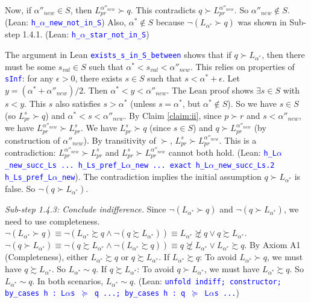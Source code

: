 \documentclass{article}
\theoremstyle{definition}
\newcommand{\tactic}[1]{\textcolor{blue}{\texttt{#1}}}
\newcommand{\pref}{\succsim} %
\newcommand{\strictpref}{\succ} %
\newcommand{\indiff}{\sim} %
\begin{document}
    Now, if $\alpha''_{new} \in S$, then $L_{pr}^{\alpha''_{new}} \strictpref q$. This contradicts $q \strictpref L_{pr}^{\alpha''_{new}}$.
    So $\alpha''_{new} \notin S$. (Lean: \tactic{h\_$\alpha$\_new\_not\_in\_S})
    Also, $\alpha^* \notin S$ because $\lnot (L_{\alpha^*} \strictpref q)$ was shown in Sub-step 1.4.1. (Lean: \tactic{h\_$\alpha$\_star\_not\_in\_S})

    The argument in Lean \tactic{exists\_s\_in\_S\_between} shows that if $q \succ L_{\alpha^*}$, then there must be some $s_{val} \in S$ such that $\alpha^* < s_{val} < \alpha''_{new}$.
    This relies on properties of \tactic{sInf}: for any $\epsilon > 0$, there exists $s \in S$ such that $s < \alpha^* + \epsilon$.
    Let $y = (\alpha^* + \alpha''_{new})/2$. Then $\alpha^* < y < \alpha''_{new}$.
    The Lean proof shows $\exists s \in S$ with $s < y$. This $s$ also satisfies $s > \alpha^*$ (unless $s=\alpha^*$, but $\alpha^* \notin S$).
    So we have $s \in S$ (so $L_{pr}^s \strictpref q$) and $\alpha^* < s < \alpha''_{new}$.
    By Claim \ref{claim:ii}, since $p \strictpref r$ and $s < \alpha''_{new}$, we have $L_{pr}^{\alpha''_{new}} \strictpref L_{pr}^s$.
    We have $L_{pr}^s \strictpref q$ (since $s \in S$) and $q \strictpref L_{pr}^{\alpha''_{new}}$ (by construction of $\alpha''_{new}$).
    By transitivity of $\strictpref$, $L_{pr}^s \strictpref L_{pr}^{\alpha''_{new}}$.
    This is a contradiction: $L_{pr}^{\alpha''_{new}} \strictpref L_{pr}^s$ and $L_{pr}^s \strictpref L_{pr}^{\alpha''_{new}}$ cannot both hold.
    (Lean: \tactic{h\_L$\alpha$\_new\_succ\_Ls ... h\_Ls\_pref\_L$\alpha$\_new ... exact h\_L$\alpha$\_new\_succ\_Ls.2 h\_Ls\_pref\_L$\alpha$\_new}).
    The contradiction implies the initial assumption $q \strictpref L_{\alpha^*}$ is false. So $\lnot (q \strictpref L_{\alpha^*})$.

    \textit{Sub-step 1.4.3: Conclude indifference.}
    Since $\lnot (L_{\alpha^*} \strictpref q)$ and $\lnot (q \strictpref L_{\alpha^*})$, we need to use completeness.
    $\lnot (L_{\alpha^*} \strictpref q) \equiv \lnot (L_{\alpha^*} \pref q \land \lnot (q \pref L_{\alpha^*})) \equiv L_{\alpha^*} \not\pref q \lor q \pref L_{\alpha^*}$.
    $\lnot (q \strictpref L_{\alpha^*}) \equiv \lnot (q \pref L_{\alpha^*} \land \lnot (L_{\alpha^*} \pref q)) \equiv q \not\pref L_{\alpha^*} \lor L_{\alpha^*} \pref q$.
    By Axiom A1 (Completeness), either $L_{\alpha^*} \pref q$ or $q \pref L_{\alpha^*}$.
    If $L_{\alpha^*} \pref q$: To avoid $L_{\alpha^*} \strictpref q$, we must have $q \pref L_{\alpha^*}$. So $L_{\alpha^*} \indiff q$.
    If $q \pref L_{\alpha^*}$: To avoid $q \strictpref L_{\alpha^*}$, we must have $L_{\alpha^*} \pref q$. So $L_{\alpha^*} \indiff q$.
    In both scenarios, $L_{\alpha^*} \indiff q$.
    (Lean: \tactic{unfold indiff; constructor; by\_cases h : L$\alpha$s $\succeq$ q ...; by\_cases h : q $\succeq$ L$\alpha$s ...})
\end{document}
